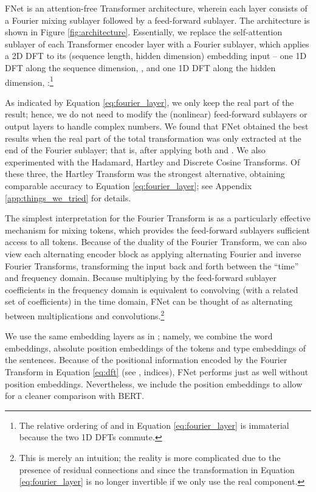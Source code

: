\documentclass[11pt]{article}
\begin{document}
FNet is an attention-free Transformer architecture, wherein each layer consists of a Fourier mixing sublayer followed by a feed-forward sublayer. The architecture is shown in Figure \ref{fig:architecture}. Essentially, we replace the self-attention sublayer of each Transformer encoder layer with a Fourier sublayer, which applies a 2D DFT to its (sequence length, hidden dimension) embedding input -- one 1D DFT along the sequence dimension, , and one 1D DFT along the hidden dimension, :\footnote{The relative ordering of  and  in Equation \eqref{eq:fourier_layer} is immaterial because the two 1D DFTs commute.}

As indicated by Equation \eqref{eq:fourier_layer}, we only keep the real part of the result; hence, we do not need to modify the (nonlinear) feed-forward sublayers or output layers to handle complex numbers. We found that FNet obtained the best results when the real part of the total transformation was only extracted at the end of the Fourier sublayer; that is, after applying both  and .
We also experimented with the Hadamard, Hartley and Discrete Cosine Transforms. Of these three, the Hartley Transform was the strongest alternative, obtaining comparable accuracy to Equation \eqref{eq:fourier_layer}; see Appendix \ref{app:things_we_tried} for details.

The simplest interpretation for the Fourier Transform is as a particularly effective mechanism for mixing tokens, which  provides the feed-forward sublayers sufficient access to all tokens. Because of the duality of the Fourier Transform, we can also view each alternating encoder block as applying alternating Fourier and inverse Fourier Transforms, transforming the input back and forth between the ``time'' and frequency domain. Because multiplying by the feed-forward sublayer coefficients in the frequency domain is equivalent to convolving (with a related set of coefficients) in the time domain, FNet can be thought of as alternating between multiplications and  convolutions.\footnote{This is merely an intuition; the reality is more complicated due to the presence of residual connections and since the transformation in Equation \eqref{eq:fourier_layer} is no longer invertible if we only use the real component.}

We use the same embedding layers as in \citet{devlin2018bert}; namely, we combine the word embeddings, absolute position embeddings of the tokens and type embeddings of the sentences. Because of the positional information encoded by the Fourier Transform in Equation \eqref{eq:dft} (see ,  indices), FNet performs just as well without position embeddings. Nevertheless, we include the position embeddings to allow for a cleaner comparison with BERT.
\end{document}
